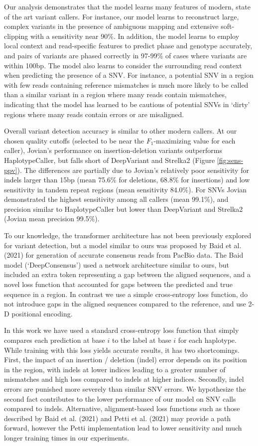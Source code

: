 \documentclass[]{article}
\begin{document}
Our analysis demonstrates that the model learns many features of modern, state of the art variant callers. For instance, our model learns to reconstruct large, complex variants in the presence of ambiguous mapping and extensive soft-clipping with a sensitivity near 90\%. In addition, the model learns to employ local context and read-specific features to predict phase and genotype accurately, and pairs of variants are phased correctly in 97-99\% of cases where variants are within 100bp.  The model also learns to consider the surrounding read context when predicting the presence of a SNV. For instance, a potential SNV in a region with few reads containing reference mismatches is much more likely to be called than a similar variant in a region where many reads contain mismatches, indicating that the model has learned to be cautious of potential SNVs in `dirty' regions where many reads contain errors or are misaligned. 

Overall variant detection accuracy is similar to other modern callers. At our chosen quality cutoffs (selected to be near the $F_1$-maximizing value for each caller), Jovian's performance on insertion-deletion variants outperforms HaplotypeCaller, but falls short of DeepVariant and Strelka2 (Figure \ref{fig:sens-ppv}). The differences are partially due to Jovian's relatively poor sensitivity for indels larger than 15bp (mean 75.6\% for deletions, 68.8\% for insertions) and low sensitivity in tandem repeat regions (mean sensitivity 84.0\%).  For SNVs Jovian demonstrated the highest sensitivity among all callers (mean 99.1\%), and precision similar to HaplotypeCaller but lower than DeepVariant and Strelka2 (Jovian mean precision 99.5\%). 

To our knowledge, the transformer architecture has not been previously explored for variant detection, but a model similar to ours was proposed by Baid et al. (2021) for generation of accurate consensus reads from PacBio data. The Baid model (`DeepConsensus') used a network architecture similar to ours, but included an extra token representing a gap between the aligned sequences, and a novel loss function that accounted for gaps between the predicted and true sequence in a region. In contrast we use a simple cross-entropy loss function, do not introduce gaps in the aligned sequences compared to the reference, and use 2-D positional encoding.  

In this work we have used a standard cross-entropy loss function that simply compares each prediction at base $i$ to the label at base $i$ for each haplotype. While training with this loss yields accurate results, it has two shortcomings. First, the impact of an insertion / deletion (indel) error depends on its position in the region, with indels at lower indices leading to a greater number of mismatches and high loss compared to indels at higher indices. Secondly, indel errors are punished more severely than similar SNV errors. We hypothesize the second fact contributes to the lower performance of our model on SNV calls compared to indels. Alternative, alignment-based loss functions such as those described by Baid et al. (2021) and Petti et al. (2021) may provide a path forward, however the Petti implementation lead to lower sensitivity and much longer training times in our experiments. 
\end{document}
